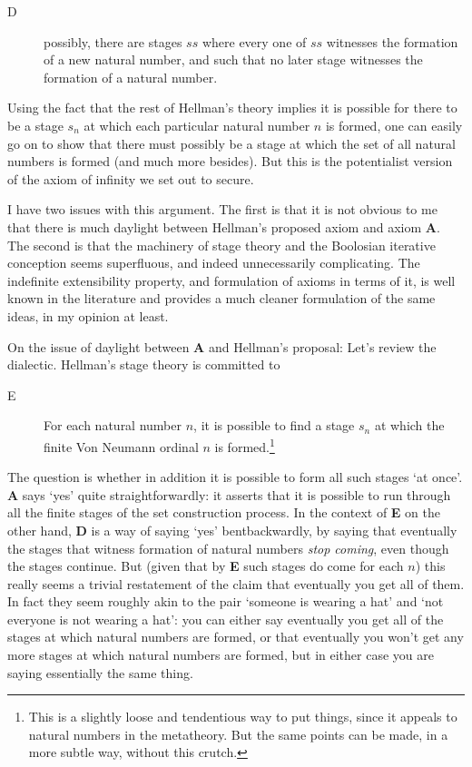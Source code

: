 \documentclass{asl}
\theoremstyle{definition}
\begin{document}
\begin{description}
    \item[D] possibly, there are stages $ss$ 
    where every one of $ss$ witnesses the formation of a new natural number, 
    and such that no later stage witnesses the formation of a natural number.
\end{description}

Using the fact that the rest of Hellman's theory implies 
it is possible for there to be a stage $s_n$ at which 
each particular natural number $n$ is formed, 
one can easily go on to show that there must possibly be a stage 
at which the set of all natural numbers is formed (and much more besides). 
But this is the potentialist version of the axiom of infinity we set out to secure.

I have two issues with this argument. 
The first is that it is not obvious to me 
that there is much daylight between Hellman's proposed axiom 
and axiom {\bf A}. The second is that the machinery of stage theory 
and the Boolosian iterative conception seems superfluous, 
and indeed unnecessarily complicating. The indefinite extensibility property,
and formulation of axioms in terms of it, is well known in the literature 
and provides a much cleaner formulation of the same ideas, in my opinion at least.

On the issue of daylight between {\bf A} and Hellman's proposal: 
Let's review the dialectic. Hellman's stage theory is committed to 

\begin{description} 
    \item[E] For each natural number $n$, 
    it is possible to find a stage $s_n$ at which the 
    finite Von Neumann ordinal $n$ is formed.\footnote{
        This is a slightly loose and tendentious way to put things,
        since it appeals to natural numbers in the metatheory. But
        the same points can be made, in a more subtle way, without
        this crutch.
    }
\end{description} 
The question is whether in addition it is possible to form 
all such stages `at once'. {\bf A} says `yes' quite straightforwardly: 
it asserts that it is possible to run through all the finite stages 
of the set construction process. In the context of {\bf E} on the other hand, 
{\bf D} is a way of saying `yes' bentbackwardly, by saying that eventually 
the stages that witness formation of natural numbers \emph{stop coming}, 
even though the stages continue. But (given that by {\bf E} such stages 
do come for each $n$) this really seems a trivial restatement of the 
claim that eventually you get all of them.  In fact they seem roughly akin 
to the pair `someone is wearing a hat' and `not everyone is not wearing a hat': 
you can either say eventually you get all of the stages at which natural numbers 
are formed, or that eventually you won't get any more stages at which natural 
numbers are formed, but in either case you are saying essentially the same thing.
\end{document}
